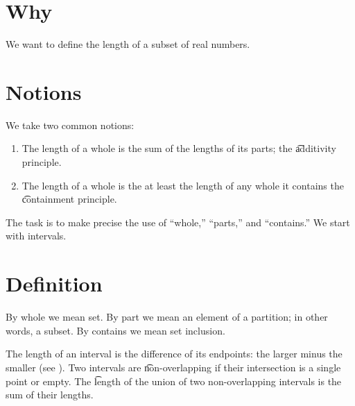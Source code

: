 
\section*{Why}

We want to define the length of a subset of real numbers.

\section*{Notions}

We take two common notions:

\begin{enumerate}
  \item The length of a whole is the sum of the lengths of its parts; the \t{additivity principle}.
  \item The length of a whole is the at least the length of any whole it contains the \t{containment principle}.
\end{enumerate}
The task is to make precise the use of ``whole,'' ``parts,'' and ``contains.''
We start with intervals.

\section*{Definition}

By whole we mean set.
By part we mean an element of a partition; in other words, a subset.
By contains we mean set inclusion.

The length of an interval is the difference of its endpoints: the larger minus the smaller (see ).
Two intervals are \t{non-overlapping} if their intersection is a single point or empty.
The \t{length} of the union of two non-overlapping intervals is the sum of their lengths.

